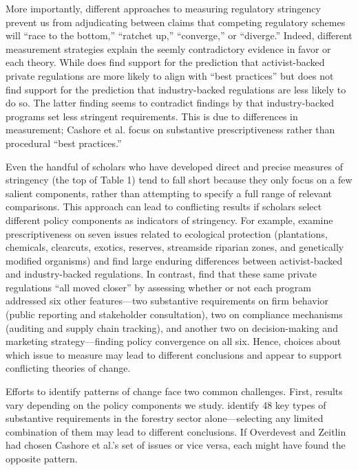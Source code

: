 \documentclass[
      12pt,
            Review ]{article}
\begin{document}
More importantly, different approaches to measuring regulatory
stringency prevent us from adjudicating between claims that competing
regulatory schemes will ``race to the bottom,'' ``ratchet up,''
``converge,'' or ``diverge.'' Indeed, different measurement strategies
explain the seemly contradictory evidence in favor or each theory. While
\citet{VanderVen2015} does find support for the prediction that
activist-backed private regulations are more likely to align with ``best
practices'' but does not find support for the prediction that
industry-backed regulations are less likely to do so. The latter finding
seems to contradict findings by \citet{Cashore2004} that industry-backed
programs set less stringent requirements. This is due to differences in
measurement; Cashore et al. focus on substantive prescriptiveness rather
than procedural ``best practices.''

Even the handful of scholars who have developed direct and precise
measures of stringency (the top of Table 1) tend to fall short because
they only focus on a few salient components, rather than attempting to
specify a full range of relevant comparisons. This approach can lead to
conflicting results if scholars select different policy components as
indicators of stringency. For example, \citet{Cashore2004} examine
prescriptiveness on seven issues related to ecological protection
(plantations, chemicals, clearcuts, exotics, reserves, streamside
riparian zones, and genetically modified organisms) and find large
enduring differences between activist-backed and industry-backed
regulations. In contrast, \citet{Overdevest2014} find that these same
private regulations ``all moved closer'' by assessing whether or not
each program addressed six other features---two substantive requirements
on firm behavior (public reporting and stakeholder consultation), two on
compliance mechanisms (auditing and supply chain tracking), and another
two on decision-making and marketing strategy---finding policy
convergence on all six. Hence, choices about which issue to measure may
lead to different conclusions and appear to support conflicting theories
of change.

Efforts to identify patterns of change face two common challenges.
First, results vary depending on the policy components we study.
\citet{McDermott2008} identify 48 key types of substantive requirements
in the forestry sector alone---selecting any limited combination of them
may lead to different conclusions. If Overdevest and Zeitlin had chosen
Cashore et al.'s set of issues or vice versa, each might have found the
opposite pattern.
\end{document}
